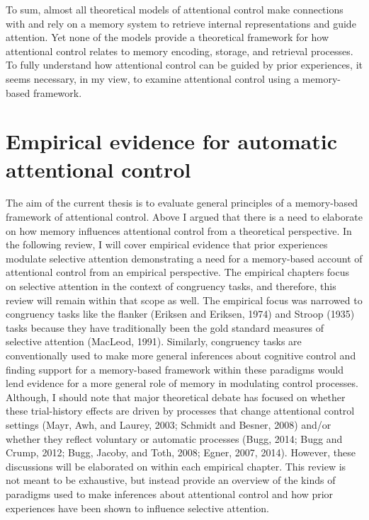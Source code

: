 \documentclass[]{DissertateCUNY}
\begin{document}
To sum, almost all theoretical models of attentional control make
connections with and rely on a memory system to retrieve internal
representations and guide attention. Yet none of the models provide a
theoretical framework for how attentional control relates to memory
encoding, storage, and retrieval processes. To fully understand how
attentional control can be guided by prior experiences, it seems
necessary, in my view, to examine attentional control using a
memory-based framework.

\hypertarget{empirical-evidence-for-automatic-attentional-control}{%
\section{Empirical evidence for automatic attentional
control}\label{empirical-evidence-for-automatic-attentional-control}}

The aim of the current thesis is to evaluate general principles of a
memory-based framework of attentional control. Above I argued that there
is a need to elaborate on how memory influences attentional control from
a theoretical perspective. In the following review, I will cover
empirical evidence that prior experiences modulate selective attention
demonstrating a need for a memory-based account of attentional control
from an empirical perspective. The empirical chapters focus on selective
attention in the context of congruency tasks, and therefore, this review
will remain within that scope as well. The empirical focus was narrowed
to congruency tasks like the flanker (Eriksen and Eriksen, 1974) and
Stroop (1935) tasks because they have traditionally been the gold
standard measures of selective attention (MacLeod, 1991). Similarly,
congruency tasks are conventionally used to make more general inferences
about cognitive control and finding support for a memory-based framework
within these paradigms would lend evidence for a more general role of
memory in modulating control processes. Although, I should note that
major theoretical debate has focused on whether these trial-history
effects are driven by processes that change attentional control settings
(Mayr, Awh, and Laurey, 2003; Schmidt and Besner, 2008) and/or whether
they reflect voluntary or automatic processes (Bugg, 2014; Bugg and
Crump, 2012; Bugg, Jacoby, and Toth, 2008; Egner, 2007, 2014). However,
these discussions will be elaborated on within each empirical chapter.
This review is not meant to be exhaustive, but instead provide an
overview of the kinds of paradigms used to make inferences about
attentional control and how prior experiences have been shown to
influence selective attention.
\end{document}
